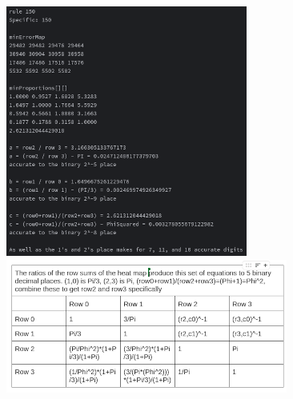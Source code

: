 \documentclass[11pt]{article}
\begin{document}
\begin{center}
\includegraphics{PiRatios}\\
\includegraphics{RatioEquations}\\
\end{center}



\end{document}
